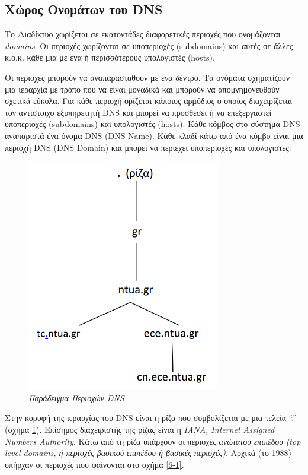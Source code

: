 %
%
\subsection{Χώρος Ονομάτων του DNS}

Το Διαδίκτυο χωρίζεται σε εκατοντάδες διαφορετικές περιοχές που ονομάζονται \emph{domains}. Οι περιοχές χωρίζονται σε υποπεριοχές (subdomains) και αυτές σε άλλες κ.ο.κ. κάθε μια με ένα ή περισσότερους υπολογιστές (hosts).

Οι περιοχές μπορούν να αναπαρασταθούν με ένα δέντρο. Τα ονόματα σχηματίζουν μια ιεραρχία με τρόπο που να είναι μοναδικά και μπορούν να απομνημονευθούν σχετικά εύκολα. Για κάθε περιοχή ορίζεται κάποιος αρμόδιος ο οποίος διαχειρίζεται τον αντίστοιχο εξυπηρετητή DNS και μπορεί να προσθέσει ή να επεξεργαστεί υποπεριοχές (subdomains) και υπολογιστές (hosts). Κάθε κόμβος στο σύστημα DNS αναπαριστά ένα όνομα DNS (DNS Name). Κάθε κλαδί κάτω από ένα κόμβο είναι μια περιοχή DNS (DNS Domain) και μπορεί να περιέχει υποπεριοχές και υπολογιστές.   

\begin{figure}[!ht]
  \centering
  \includegraphics[width=0.75\textwidth]{images/chapter6/6-0}
  \caption {\textsl{Παράδειγμα Περιοχών DNS}}
  \label{6-0}
\end{figure}

Στην κορυφή της ιεραρχίας του DNS είναι η ρίζα που συμβολίζεται με μια τελεία ``.'' (σχήμα \ref{6-0}). Επίσημος διαχειριστής της ρίζας είναι η \emph{IANA, Internet Assigned Numbers Authority}. Κάτω από τη ρίζα υπάρχουν οι περιοχές \emph{ανώτατου επιπέδου (top level domains, ή περιοχές βασικού επιπέδου ή βασικές περιοχές)}. Αρχικά (το 1988) υπήρχαν οι περιοχές που φαίνονται στο σχήμα \ref{6-1}.

